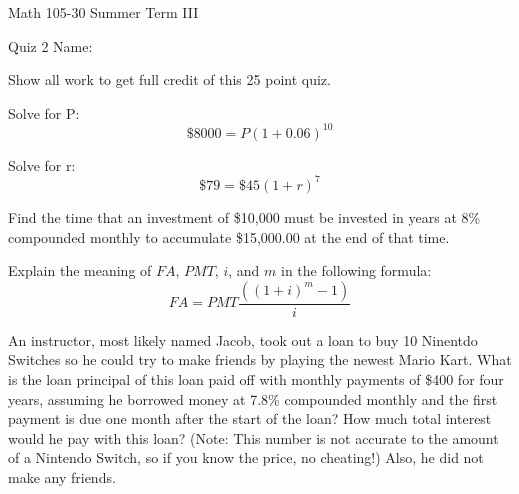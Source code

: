 \documentclass[11pt,epsfig]{article}
\begin{document}
Math 105-30 Summer Term III 

Quiz 2 \hspace{1.9in} {Name:} {\underline {\hspace{3.5in}}}
\vspace{2pc}

Show all work to get full credit of this 25 point quiz.
\vspace{2pc}

\begin{problem}{5}
Solve for P:
\begin{equation*}
\$8000=P{(1+0.06)}^{10}
\end{equation*}
\vfill
\end{problem}

\begin{problem}{5}
Solve for r:
\begin{equation*}
\$79=\$45(1+r)^7
\end{equation*}
\vfill
\end{problem}

\begin{problem}{5}
Find the time that an investment of \$10,000 must be invested in years at 8\% compounded monthly to accumulate \$15,000.00 at the end of that time.

\vfill
\end{problem}

\newpage

\begin{problem}{4}
Explain the meaning of $FA$, $PMT$, $i$, and $m$ in the following formula:
\begin{equation*}
FA = PMT \frac{((1+i)^m -1)}{i}
\end{equation*}

\vfill
\end{problem}

\begin{problem}{6}
An instructor, most likely named Jacob, took out a loan to buy 10 Ninentdo Switches so he could try to make friends by playing the newest Mario Kart. What is the loan principal of this loan paid off with monthly payments of \$400 for four years, assuming he borrowed money at 7.8\% compounded monthly and the first payment is due one month after the start of the loan? How much total interest would he pay with this loan? (Note: This number is not accurate to the amount of a Nintendo Switch, so if you know the price, no cheating!) Also, he did not make any friends.
\vfill
\end{problem}

\showpoints
\end{document}
